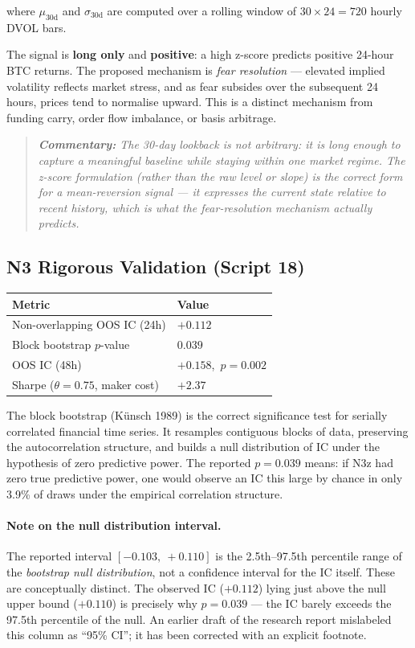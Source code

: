 \documentclass[11pt,a4paper]{article}
\newcommand{\comment}[1]{%
  \begin{quote}
    \small\itshape\textbf{Commentary:} #1
  \end{quote}
}
\begin{document}
where $\mu_{30\mathrm{d}}$ and $\sigma_{30\mathrm{d}}$ are computed over a rolling window of $30 \times 24 = 720$ hourly DVOL bars.

The signal is \textbf{long only} and \textbf{positive}: a high z-score predicts positive 24-hour BTC returns. The proposed mechanism is \emph{fear resolution} --- elevated implied volatility reflects market stress, and as fear subsides over the subsequent 24 hours, prices tend to normalise upward. This is a distinct mechanism from funding carry, order flow imbalance, or basis arbitrage.

\comment{The 30-day lookback is not arbitrary: it is long enough to capture a meaningful baseline while staying within one market regime. The z-score formulation (rather than the raw level or slope) is the correct form for a mean-reversion signal --- it expresses the current state relative to recent history, which is what the fear-resolution mechanism actually predicts.}

\subsection{N3 Rigorous Validation (Script 18)}

\begin{center}
\begin{tabular}{@{}ll@{}}
\toprule
\textbf{Metric} & \textbf{Value} \\
\midrule
Non-overlapping OOS IC (24h) & $+0.112$ \\
Block bootstrap $p$-value & $0.039$ \\
OOS IC (48h) & $+0.158$,\ $p = 0.002$ \\
Sharpe ($\theta = 0.75$, maker cost) & $+2.37$ \\
\bottomrule
\end{tabular}
\end{center}

The block bootstrap (K\"{u}nsch 1989) is the correct significance test for serially correlated financial time series. It resamples contiguous blocks of data, preserving the autocorrelation structure, and builds a null distribution of IC under the hypothesis of zero predictive power. The reported $p = 0.039$ means: if N3z had zero true predictive power, one would observe an IC this large by chance in only 3.9\% of draws under the empirical correlation structure.

\paragraph{Note on the null distribution interval.}
The reported interval $[-0.103,\ +0.110]$ is the 2.5th--97.5th percentile range of the \emph{bootstrap null distribution}, not a confidence interval for the IC itself. These are conceptually distinct. The observed IC ($+0.112$) lying just above the null upper bound ($+0.110$) is precisely why $p = 0.039$ --- the IC barely exceeds the 97.5th percentile of the null. An earlier draft of the research report mislabeled this column as ``95\% CI''; it has been corrected with an explicit footnote.
\end{document}
